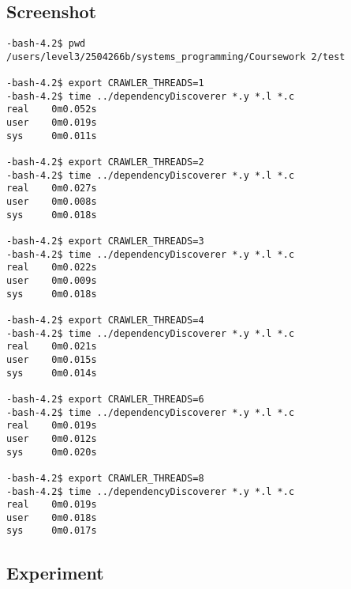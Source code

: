 \documentclass{article}
\begin{document}
\subsection{Screenshot}

\begin{verbatim}
-bash-4.2$ pwd
/users/level3/2504266b/systems_programming/Coursework 2/test

-bash-4.2$ export CRAWLER_THREADS=1
-bash-4.2$ time ../dependencyDiscoverer *.y *.l *.c
real    0m0.052s
user    0m0.019s
sys     0m0.011s

-bash-4.2$ export CRAWLER_THREADS=2
-bash-4.2$ time ../dependencyDiscoverer *.y *.l *.c
real    0m0.027s
user    0m0.008s
sys     0m0.018s

-bash-4.2$ export CRAWLER_THREADS=3
-bash-4.2$ time ../dependencyDiscoverer *.y *.l *.c
real    0m0.022s
user    0m0.009s
sys     0m0.018s

-bash-4.2$ export CRAWLER_THREADS=4
-bash-4.2$ time ../dependencyDiscoverer *.y *.l *.c
real    0m0.021s
user    0m0.015s
sys     0m0.014s

-bash-4.2$ export CRAWLER_THREADS=6
-bash-4.2$ time ../dependencyDiscoverer *.y *.l *.c
real    0m0.019s
user    0m0.012s
sys     0m0.020s

-bash-4.2$ export CRAWLER_THREADS=8
-bash-4.2$ time ../dependencyDiscoverer *.y *.l *.c
real    0m0.019s
user    0m0.018s
sys     0m0.017s
\end{verbatim}


\newpage

\subsection{Experiment}
\end{document}
